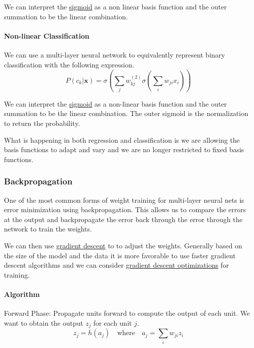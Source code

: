 \documentclass[12pt]{article}
\begin{document}
                We can interpret the \hyperref[sec:Sigmoid]{sigmoid} as a non linear basis function and the outer summation to be the linear
                combination. 
                
            \paragraph{Non-linear Classification}
                We can use a multi-layer neural network to equivalently represent binary classification with the following
                expression.
                $$ P(c_k | \boldsymbol{x}) = \sigma(\sum_j w_{kj}^{(2)} \sigma(\sum_i w_{ji} x_i)) $$
                
                We can interpret the \hyperref[sec:Sigmoid]{sigmoid} as a non-linear basis function and the outer summation to be the linear
                combination. The outer sigmoid is the normalization to return the probability.

            What is happening in both regression and classification is we are allowing the basis functions to adapt and
            vary and we are no longer restricted to fixed basis functions.
        
        \subsubsection{Backpropagation} \label{sec:Backprop}
            One of the most common forms of weight training for multi-layer neural nets is error minimization using
            backpropagation. This allows us to compare the errors at the output and backpropagate the error
            back through the error through the network to train the weights.

            We can then use \hyperref[sec:GD]{gradient descent} to to adjust the weights. Generally based on the size of
            the model and the data it is more favorable to use faster gradient descent algorithms and we can consider
            \hyperref[sec:GDO]{gradient descent optimizations} for training.

            \paragraph{Algorithm}
                Forward Phase: Propagate units forward to compute the output of each unit. We want to obtain the output
                $z_j$ for each unit $j$.
                $$ z_j = h(a_j) \quad \text{where} \quad a_j = \sum_i w_{ji} z_i $$
\end{document}
